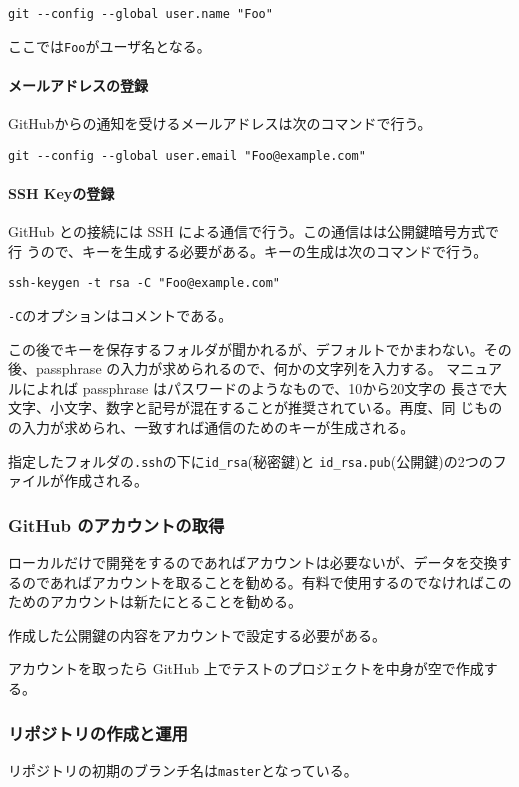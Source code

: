 \Verb+git --config --global user.name "Foo"+

ここでは\Verb+Foo+がユーザ名となる。
\paragraph{メールアドレスの登録}
GitHubからの通知を受けるメールアドレスは次のコマンドで行う。

\Verb+git --config --global user.email "Foo@example.com"+
\paragraph{SSH Keyの登録}
GitHub との接続には SSH による通信で行う。この通信はは公開鍵暗号方式で行
うので、キーを生成する必要がある。キーの生成は次のコマンドで行う。

\Verb+ssh-keygen -t rsa -C "Foo@example.com"+

\Verb+-C+のオプションはコメントである。 

この後でキーを保存するフォルダが聞かれるが、デフォルトでかまわない。その
後、passphrase の入力が求められるので、何かの文字列を入力する。
マニュアルによれば passphrase はパスワードのようなもので、10から20文字の
長さで大文字、小文字、数字と記号が混在することが推奨されている。再度、同
じものの入力が求められ、一致すれば通信のためのキーが生成される。

指定したフォルダの\Verb+.ssh+の下に\Verb+id_rsa+(秘密鍵)と
\Verb+id_rsa.pub+(公開鍵)の2つのファイルが作成される。 

\subsubsection{GitHub のアカウントの取得}
ローカルだけで開発をするのであればアカウントは必要ないが、データを交換す
るのであればアカウントを取ることを勧める。有料で使用するのでなければこの
ためのアカウントは新たにとることを勧める。

作成した公開鍵の内容をアカウントで設定する必要がある。

アカウントを取ったら GitHub 上でテストのプロジェクトを中身が空で作成する。


\subsubsection{リポジトリの作成と運用}
リポジトリの初期のブランチ名は\Verb+master+となっている。

